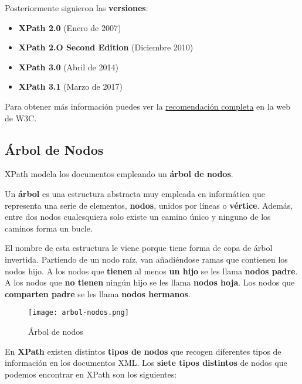 Posteriormente siguieron las \textbf{versiones}:

\begin{itemize}
    \item \textbf{XPath 2.0} (Enero de 2007)
    \item \textbf{XPath 2.O Second Edition} (Diciembre 2010)
    \item \textbf{XPath 3.0} (Abril de 2014)
    \item \textbf{XPath 3.1} (Marzo de 2017)
\end{itemize}

Para obtener más información puedes ver la \href{https://www.w3.org/TR/1999/REC-xpath-19991116/}{recomendación completa} en la web de W3C.

\subsection{Árbol de Nodos}
XPath modela los documentos empleando un \textbf{árbol de nodos}.

Un \textbf{árbol} es una estructura abstracta muy empleada en informática que representa una serie de elementos, \textbf{nodos}, unidos por líneas o \textbf{vértice}. Además, entre dos nodos cualesquiera solo existe un camino único y ninguno de los caminos forma un bucle.

El nombre de esta estructura le viene porque tiene forma de copa de árbol invertida. Partiendo de un nodo raíz, van añadiéndose ramas que contienen los nodos hijo. A los nodos que \textbf{tienen} al menos \textbf{un hijo} se les llama \textbf{nodos padre}. 	A los nodos que \textbf{no tienen} ningún hijo se les llama \textbf{nodos hoja}. Los nodos que \textbf{comparten padre} se les llama \textbf{nodos hermanos}.

\begin{figure}[H]
    \centering
    \texttt{[image: arbol-nodos.png]}
    \caption{Árbol de nodos}
\end{figure}

En \textbf{XPath} existen distintos \textbf{tipos de nodos} que recogen diferentes tipos de información en los documentos XML. Los \textbf{siete tipos distintos} de nodos que podemos encontrar en XPath son los siguientes:

